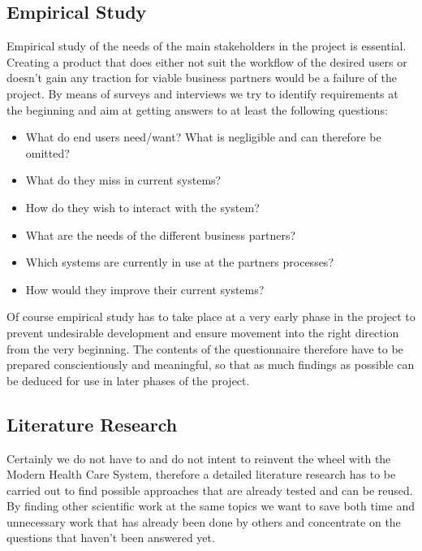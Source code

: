 \documentclass[a4paper,11pt]{article}
\begin{document}
\subsection{Empirical Study}
\label{subsect:emp_study}

Empirical study of the needs of the main stakeholders in the project is essential. Creating a product that does either not suit the workflow of the desired users or doesn't gain any traction for viable business partners would be a failure of the project. By means of surveys and interviews we try to identify requirements at the beginning and aim at getting answers to at least the following questions:

\begin{itemize}
\item What do end users need/want? What is negligible and can therefore be omitted?
\item What do they miss in current systems?
\item How do they wish to interact with the system?
\item What are the needs of the different business partners?
\item Which systems are currently in use at the partners processes?
\item How would they improve their current systems?
\end{itemize}

Of course empirical study has to take place at a very early phase in the project to prevent undesirable development and ensure movement into the right direction from the very beginning. The contents of the questionnaire therefore have to be prepared conscientiously and meaningful, so that as much findings as possible can be deduced for use in later phases of the project.

\subsection{Literature Research}

Certainly we do not have to and do not intent to reinvent the wheel with the Modern Health Care System, therefore a detailed literature research has to be carried out to find possible approaches that are already tested and can be reused. By finding other scientific work at the same topics we want to save both time and unnecessary work that has already been done by others and concentrate on the questions that haven't been answered yet. \\
\end{document}

